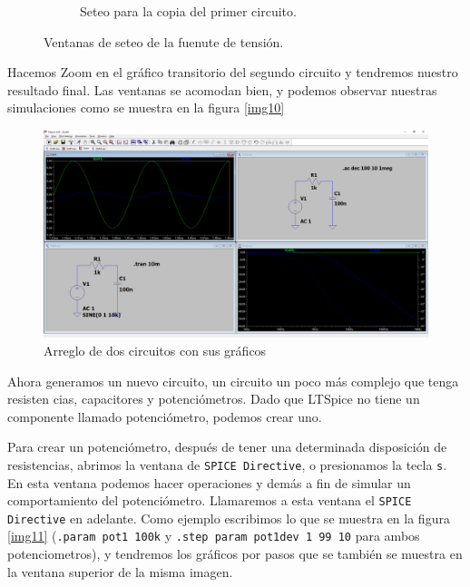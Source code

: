 \documentclass[a4paper]{article} %
\begin{document}
\begin{figure}
\begin{subfigure}[b]{0.45\textwidth}
		\caption{Seteo para la copia del primer circuito.} %
		\label{img8} %
	\end{subfigure}
	\caption{Ventanas de seteo de la fuenute de tensión.}
	\label{fuentes7y8}
\end{figure}

Hacemos Zoom en el gráfico transitorio del segundo circuito y tendremos nuestro resultado final. Las ventanas se acomodan bien, y podemos observar nuestras simulaciones como se muestra en la figura \eqref{img10}

\begin{figure} %
	\centering %
	\includegraphics[scale=0.3]{IMAGENES/img10} %
	\caption{Arreglo de dos circuitos con sus gráficos} %
	\label{img10} %
\end{figure} %

Ahora generamos un nuevo circuito, un circuito un poco más complejo que tenga resisten cias, capacitores y potenciómetros. Dado que LTSpice no tiene un componente llamado potenciómetro, podemos crear uno. 

Para crear un potenciómetro, después de tener una determinada disposición de resistencias, abrimos la ventana de \texttt{SPICE Directive}, o presionamos la tecla \texttt{s}. En esta ventana podemos hacer operaciones y demás a fin de simular un comportamiento del potenciómetro. Llamaremos a esta ventana el \texttt{SPICE Directive} en adelante. Como ejemplo escribimos lo que se muestra en la figura \eqref{img11} (\texttt{.param pot1 100k} y \texttt{.step param pot1dev 1 99 10} para ambos potenciometros), y tendremos los gráficos por pasos que se también se muestra en la ventana superior de la misma imagen.
\end{document}
